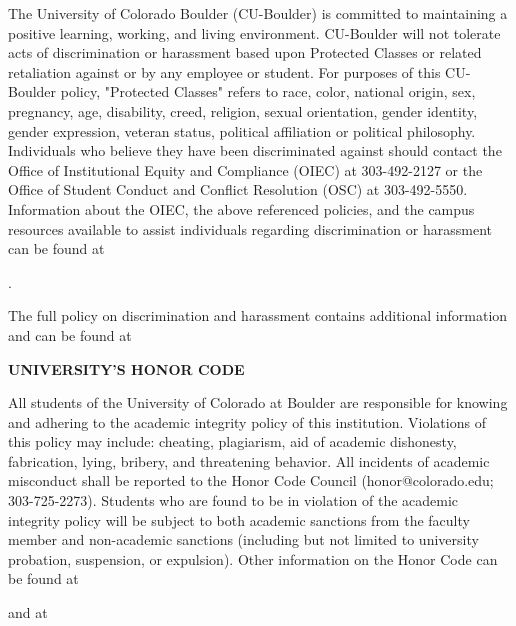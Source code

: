 \documentclass[11pt]{article}
\begin{document}
The University of Colorado Boulder (CU-Boulder) is committed to maintaining a positive learning, working, and living environment. CU-Boulder will not tolerate acts of discrimination or harassment based upon Protected Classes or related retaliation against or by any employee or student. For purposes of this CU-Boulder policy, "Protected Classes" refers to race, color, national origin, sex, pregnancy, age, disability, creed, religion, sexual orientation, gender identity, gender expression, veteran status, political affiliation or political philosophy. Individuals who believe they have been discriminated against should contact the Office of Institutional Equity and Compliance (OIEC) at 303-492-2127 or the Office of Student Conduct and Conflict Resolution (OSC) at 303-492-5550. Information about the OIEC, the above referenced policies, and the campus resources available to assist individuals regarding discrimination or harassment can be found at 

. 

The full policy on discrimination and harassment contains additional information and can be found at 



\bigskip
\textbf{\normalsize UNIVERSITY'S HONOR CODE}

All students of the University of Colorado at Boulder are
responsible for knowing and adhering to the academic integrity
policy of this institution. Violations of this policy may include:
cheating, plagiarism, aid of academic dishonesty, fabrication,
lying, bribery, and threatening behavior. All incidents of academic
misconduct shall be reported to the Honor Code Council
(honor@colorado.edu; 303-725-2273). Students who are found to be in
violation of the academic integrity policy will be subject to both
academic sanctions from the faculty member and non-academic
sanctions (including but not limited to university probation,
suspension, or expulsion). Other information on the Honor Code can
be found at 


and at

\end{document}
